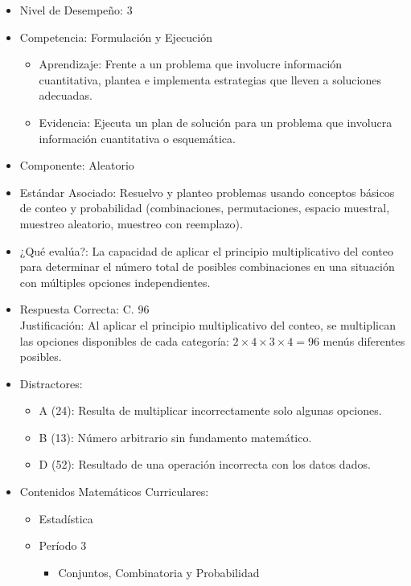 \documentclass[
]{article}
\providecommand{\tightlist}{%
  \setlength{\itemsep}{0pt}\setlength{\parskip}{0pt}}
\begin{document}
\begin{itemize}
\item
  Nivel de Desempeño: 3
\item
  Competencia: Formulación y Ejecución

  \begin{itemize}
  \tightlist
  \item
    Aprendizaje: Frente a un problema que involucre información
    cuantitativa, plantea e implementa estrategias que lleven a
    soluciones adecuadas.
  \item
    Evidencia: Ejecuta un plan de solución para un problema que
    involucra información cuantitativa o esquemática.
  \end{itemize}
\item
  Componente: Aleatorio
\item
  Estándar Asociado: Resuelvo y planteo problemas usando conceptos
  básicos de conteo y probabilidad (combinaciones, permutaciones,
  espacio muestral, muestreo aleatorio, muestreo con reemplazo).
\item
  ¿Qué evalúa?: La capacidad de aplicar el principio multiplicativo del
  conteo para determinar el número total de posibles combinaciones en
  una situación con múltiples opciones independientes.
\item
  Respuesta Correcta: C. 96\\
  Justificación: Al aplicar el principio multiplicativo del conteo, se
  multiplican las opciones disponibles de cada categoría:
  \(2 \times 4 \times 3 \times 4 = 96\) menús diferentes posibles.
\item
  Distractores:

  \begin{itemize}
  \tightlist
  \item
    A (24): Resulta de multiplicar incorrectamente solo algunas
    opciones.
  \item
    B (13): Número arbitrario sin fundamento matemático.
  \item
    D (52): Resultado de una operación incorrecta con los datos dados.
  \end{itemize}
\item
  Contenidos Matemáticos Curriculares:

  \begin{itemize}
  \tightlist
  \item
    Estadística
  \item
    Período 3

    \begin{itemize}
    \tightlist
    \item
      Conjuntos, Combinatoria y Probabilidad


\end{itemize}
\end{itemize}
\end{itemize}
\end{document}
